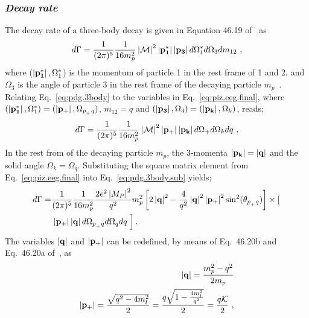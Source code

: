 \subsubsection{\emph{Decay rate}}
The decay rate of a three-body decay is given in Equation 46.19 of~\cite{pdg2014} as
\begin{align}\label{eq:pdg.3body}
d\Gamma = \frac{1}{(2 \pi)^5} \frac{1}{16 m_p^2} \left|{\cal M}\right|^2 \left|\bf{p_1^*}\right| \left|\bf{p_3}\right|d\Omega_1^*d\Omega_3 dm_{12} \ ,
\end{align}
%
where ($\left|\bf{p_1^*}\right|,\Omega_1^*$) is the momentum of particle 1 in the rest frame of 1 and 2, and $\Omega_3$ is the angle of particle 3 in the rest frame of the decaying particle $m_p$~\cite{pdg2014}. Relating Eq.~\ref{eq:pdg.3body} to the variables in Eq.~\ref{eq:piz.eeg.final}, where $(\left|\bf{p_1^*}\right|,\Omega_1^*) = (\left|\bf{p_+}\right|,\Omega_{p_{_+}q})$, $m_{12} = q$ and $(\left|\bf{p_3}\right|,\Omega_3) = (\left|\bf{p_k}\right|,\Omega_k)$, reads;
\begin{align}\label{eq:pdg.3body.sub}
d\Gamma = \frac{1}{(2 \pi)^5} \frac{1}{16 m_p^2} \left|{\cal M}\right|^2 \left|\bf{p_+}\right| \left|\bf{p_k}\right|d\Omega_+d\Omega_k dq \ ,
\end{align}
%
In the rest from of the decaying particle $m_p$, the 3-momenta $\left|\bf{p_k}\right| = \left|\bf{q}\right|$ and the solid angle $\Omega_k = \Omega_q$. Substituting the square matrix element from Eq.~\ref{eq:piz.eeg.final} into Eq.~\ref{eq:pdg.3body.sub} yields;
%
\begin{align}\label{eq:pdg.3body.sub2}
d\Gamma = & \frac{1}{(2 \pi)^5} \frac{1}{16 m_p^2} \frac{2e^{2}\left|M_{P}\right|^{2}}{q^{2}}m_p^2
\left[2\left|\bf{q}\right|^2 - \frac{4}{q^2} \left|\bf{q}\right|^2 \left|\bf{p_{+}}\right|^2 \sin^2(\theta_{p_{_+}q}) \right]
 \times \left[ \nonumber \right. \\ &\left. \left|\bf{p_+}\right| \left|\bf{q}\right|d\Omega_{p_{_+}q}d\Omega_q dq\ \right].
\end{align}
The variables $\left|\bf{q}\right|$ and $\left|\bf{p_+}\right|$ can be redefined, by means of Eq.~46.20b and Eq.~46.20a of~\cite{pdg2014}, as 
\begin{align}
\left|\bf{q}\right| = \frac{m_p^2 - q^2}{2m_p} \label{eq:eeg.qeq} \\
\left|\bf{p_+}\right| = \frac{\sqrt{q^2 - 4m_l^2}}{2} = \frac{q\sqrt{1 - \frac{4m_l^2}{q^2} } } {2} =\frac{q {\cal K}  } {2}  \label{eq:eeg.p+eq} \ ,
\end{align} 

